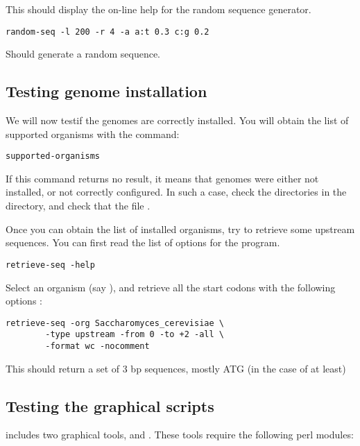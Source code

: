 \documentclass{article}
\begin{document}
This should display the on-line help for the random sequence
generator. 

\begin{verbatim}
random-seq -l 200 -r 4 -a a:t 0.3 c:g 0.2
\end{verbatim}

Should generate a random sequence.

\subsection{Testing genome installation}

We will now testif the genomes are correctly installed. You will
obtain the list of supported organisms with the command:

\begin{verbatim}
supported-organisms
\end{verbatim}

If this command returns no result, it means that genomes were either
not installed, or not correctly configured. In such a case, check the
directories in the  directory, and check that the
file .

Once you can obtain the list of installed organisms, try to retrieve
some upstream sequences. You can first read the list of options for the
 program.

\begin{verbatim}
retrieve-seq -help
\end{verbatim}

Select an organism (say ), and
retrieve all the start codons with the following options :

\begin{verbatim}
retrieve-seq -org Saccharomyces_cerevisiae \
        -type upstream -from 0 -to +2 -all \
        -format wc -nocomment 
\end{verbatim}

This should return a set of 3 bp sequences, mostly ATG (in the case of
 at least)

\subsection{Testing the graphical scripts}

\RSAT includes two graphical tools,  and
. These tools require the following  perl modules: 
\end{document}
